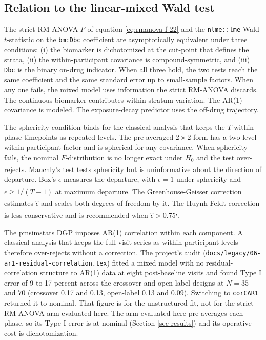 \documentclass[
  11pt,
]{article}
\begin{document}
\subsection{Relation to the linear-mixed Wald test}\label{sec-lme-relation}

The strict RM-ANOVA \(F\) of equation \eqref{eq:rmanova-f-22} and the
\texttt{nlme::lme} Wald \(t\)-statistic on the \texttt{bm:Dbc} coefficient are
asymptotically equivalent under three conditions: (i) the biomarker
is dichotomized at the cut-point that defines the strata, (ii) the
within-participant covariance is compound-symmetric, and (iii)
\texttt{Dbc} is the binary on-drug indicator. When all three hold, the two
tests reach the same coefficient and the same standard error up to
small-sample factors. When any one fails, the mixed model uses
information the strict RM-ANOVA discards. The continuous biomarker
contributes within-stratum variation. The AR(1) covariance is
modeled. The exposure-decay predictor uses the off-drug trajectory.

The sphericity condition binds for the classical analysis that
keeps the \(T\) within-phase timepoints as repeated levels. The
pre-averaged \(2 \times 2\) form has a two-level within-participant
factor and is spherical for any covariance. When sphericity fails,
the nominal \(F\)-distribution is no longer exact under \(H_0\) and the
test over-rejects. Mauchly's test\textsuperscript{} tests sphericity
but is uninformative about the direction of departure. Box's
\(\epsilon\) measures the departure, with \(\epsilon = 1\) under
sphericity and \(\epsilon \geq 1/(T-1)\) at maximum departure. The
Greenhouse-Geisser correction\textsuperscript{} estimates
\(\hat\epsilon\) and scales both degrees of freedom by it. The
Huynh-Feldt correction\textsuperscript{} is less conservative and is
recommended when \(\hat\epsilon > 0.75\)\textsuperscript{,}.

The pmsimstats DGP imposes AR(1) correlation within each component.
A classical analysis that keeps the full visit series as
within-participant levels therefore over-rejects without a
correction. The project's audit
(\texttt{docs/legacy/06-ar1-residual-correlation.tex}) fitted a mixed model
with no residual-correlation structure to AR(1) data at eight
post-baseline visits and found Type I error of 9 to 17 percent
across the crossover and open-label designs at \(N = 35\) and \(70\)
(crossover 0.17 and 0.13, open-label 0.13 and 0.09). Switching to
\texttt{corCAR1} returned it to nominal. That figure is for the
unstructured fit, not for the strict RM-ANOVA arm evaluated here.
The arm evaluated here pre-averages each phase, so its Type I error
is at nominal (Section \ref{sec-results}) and its operative cost is
dichotomization.
\end{document}
